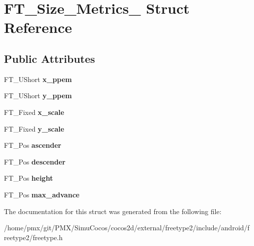 \hypertarget{structFT__Size__Metrics__}{}\section{F\+T\+\_\+\+Size\+\_\+\+Metrics\+\_\+ Struct Reference}
\label{structFT__Size__Metrics__}
\subsection*{Public Attributes}
\begin{DoxyCompactItemize}
\item 
\mbox{\label{structFT__Size__Metrics___abb42b175a3450e9d8b84483f166d6c8a}} 
F\+T\+\_\+\+U\+Short {\bfseries x\+\_\+ppem}
\item 
\mbox{\label{structFT__Size__Metrics___abcdb70cb9e39a74679bc39c07f3275f7}} 
F\+T\+\_\+\+U\+Short {\bfseries y\+\_\+ppem}
\item 
\mbox{\label{structFT__Size__Metrics___a5e92028bb9881e107a6fb75d557eaff1}} 
F\+T\+\_\+\+Fixed {\bfseries x\+\_\+scale}
\item 
\mbox{\label{structFT__Size__Metrics___a1f8b1cb3538b9920127f721dd061379d}} 
F\+T\+\_\+\+Fixed {\bfseries y\+\_\+scale}
\item 
\mbox{\label{structFT__Size__Metrics___ab5fde60a2661d7b774f61c264a2a6070}} 
F\+T\+\_\+\+Pos {\bfseries ascender}
\item 
\mbox{\label{structFT__Size__Metrics___a9b2ca3a4391803e8721ed99eb9953d52}} 
F\+T\+\_\+\+Pos {\bfseries descender}
\item 
\mbox{\label{structFT__Size__Metrics___ae3361e264fb8a9e669f118bdb244439b}} 
F\+T\+\_\+\+Pos {\bfseries height}
\item 
\mbox{\label{structFT__Size__Metrics___ac315a7a834ac1a57c7169ce021718958}} 
F\+T\+\_\+\+Pos {\bfseries max\+\_\+advance}
\end{DoxyCompactItemize}


The documentation for this struct was generated from the following file\+:\begin{DoxyCompactItemize}
\item 
/home/pmx/git/\+P\+M\+X/\+Simu\+Cocos/cocos2d/external/freetype2/include/android/freetype2/freetype.\+h\end{DoxyCompactItemize}
